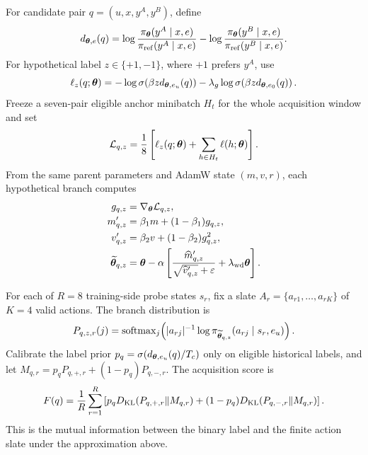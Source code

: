 For candidate pair $q=(u,x,y^A,y^B)$, define
\begin{equation}
  d_{\bm{\theta},e}(q)
  =
  \log\frac{\pi_{\bm{\theta}}(y^A\mid x,e)}
            {\pi_{\mathrm{ref}}(y^A\mid x,e)}
  -
  \log\frac{\pi_{\bm{\theta}}(y^B\mid x,e)}
            {\pi_{\mathrm{ref}}(y^B\mid x,e)}.
\end{equation}
For hypothetical label $z\in\{+1,-1\}$, where $+1$ prefers $y^A$, use
\begin{equation}
  \ell_z(q;\bm{\theta})
  =
  -\log\sigma\!\left(\beta z d_{\bm{\theta},e_u}(q)\right)
  -
  \lambda_g\log\sigma\!\left(\beta z d_{\bm{\theta},e_0}(q)\right).
  \label{eq:fork-pdpo}
\end{equation}
Freeze a seven-pair eligible anchor minibatch $H_t$ for the whole acquisition
window and set
\begin{equation}
  \mathcal{L}_{q,z}
  =
  \frac{1}{8}\left[
    \ell_z(q;\bm{\theta})+\sum_{h\in H_t}\ell(h;\bm{\theta})
  \right].
\end{equation}
From the same parent parameters and AdamW state $(m,v,r)$, each hypothetical
branch computes
\begin{align}
  g_{q,z} &= \nabla_{\bm{\theta}}\mathcal{L}_{q,z}, \\
  m'_{q,z} &= \beta_1m+(1-\beta_1)g_{q,z}, \\
  v'_{q,z} &= \beta_2v+(1-\beta_2)g_{q,z}^2, \\
  \widetilde{\bm{\theta}}_{q,z}
  &=
  \bm{\theta}-\alpha\left[
    \frac{\widehat m'_{q,z}}{\sqrt{\widehat v'_{q,z}}+\varepsilon}
    +\lambda_{\mathrm{wd}}\bm{\theta}
  \right].
  \label{eq:fork-branch}
\end{align}

For each of $R=8$ training-side probe states $s_r$, fix a slate
$A_r=\{a_{r1},\ldots,a_{rK}\}$ of $K=4$ valid actions.  The branch
distribution is
\begin{equation}
  P_{q,z,r}(j)
  =
  \operatorname{softmax}_j\!\left(
    |a_{rj}|^{-1}
    \log\pi_{\widetilde{\bm{\theta}}_{q,z}}(a_{rj}\mid s_r,e_u)
  \right).
\end{equation}
Calibrate the label prior $p_q=\sigma(d_{\bm{\theta},e_u}(q)/T_c)$ only on
eligible historical labels, and let
$M_{q,r}=p_qP_{q,+,r}+(1-p_q)P_{q,-,r}$.  The acquisition score is
\begin{equation}
  F(q)
  =
  \frac{1}{R}\sum_{r=1}^{R}
  \left[
    p_qD_{\mathrm{KL}}(P_{q,+,r}\Vert M_{q,r})
    +(1-p_q)D_{\mathrm{KL}}(P_{q,-,r}\Vert M_{q,r})
  \right].
  \label{eq:fork-score}
\end{equation}
This is the mutual information between the binary label and the finite action
slate under the approximation above.

